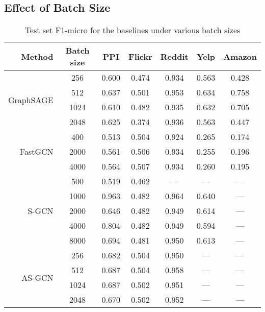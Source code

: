 \documentclass{article} \usepackage{iclr2020_conference,times}
\begin{document}
\subsection{Effect of Batch Size}
\label{appendix: batch size}
\begin{table*}[!ht]
\caption{Test set F1-micro for the baselines under various batch sizes}
    \centering
\begin{tabular}{rcccccc}
        \toprule
        {Method} & {Batch size} & {PPI} & {Flickr} & {Reddit} & {Yelp} & Amazon\\
        \midrule
        \midrule
        \multirow{4}{*}{GraphSAGE} & 256 & 0.600 & 0.474 & 0.934 & 0.563 & 0.428\\
         & 512\footnotemark[1] & 0.637 & 0.501 & 0.953 & 0.634 & 0.758\\
         & 1024 & 0.610 & 0.482 & 0.935 & 0.632 & 0.705\\
         & 2048 & 0.625 & 0.374 & 0.936 & 0.563 & 0.447\\
         \midrule
        \multirow{3}{*}{FastGCN} & 400\footnotemark[1] & 0.513 & 0.504 & 0.924 & 0.265 & 0.174\\
        & 2000 & 0.561 & 0.506  & 0.934 & 0.255 & 0.196\\
        & 4000 & 0.564 & 0.507  & 0.934 & 0.260 & 0.195\\
        \midrule
\multirow{5}{*}{S-GCN} & 500 & 0.519 & 0.462 & ---\footnotemark[5] & ---\footnotemark[5] & ---\footnotemark[3]\\
         & 1000\footnotemark[1] & 0.963 & 0.482 & 0.964 & 0.640 & ---\footnotemark[3] \\
         & 2000 & 0.646 & 0.482 & 0.949 & 0.614 & ---\footnotemark[3] \\
         & 4000 & 0.804 & 0.482 & 0.949 & 0.594 & ---\footnotemark[3] \\
         & 8000 & 0.694 & 0.481 & 0.950 & 0.613 & ---\footnotemark[3] \\
        \midrule
        \multirow{4}{*}{AS-GCN} & 256 & 0.682 & 0.504 & 0.950 & ---\footnotemark[3] & ---\footnotemark[3] \\
         & 512\footnotemark[1] & 0.687 & 0.504 & 0.958 & ---\footnotemark[3] & ---\footnotemark[3]\\
         & 1024 & 0.687 & 0.502 & 0.951 & ---\footnotemark[3] & ---\footnotemark[3]\\
         & 2048 & 0.670 & 0.502 & 0.952 & ---\footnotemark[3] & ---\footnotemark[3]\\
        \midrule

\end{tabular}
\end{table*}
\end{document}
